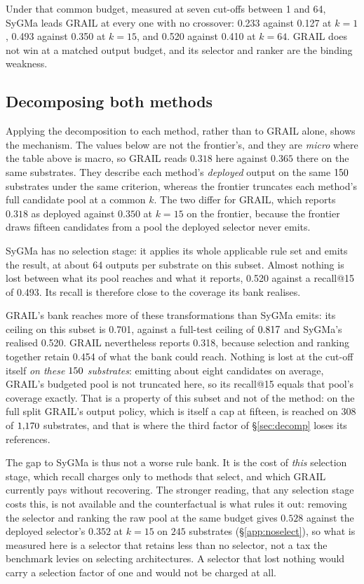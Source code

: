 Under that common budget, measured at seven cut-offs between 1 and 64, SyGMa leads GRAIL at every
one with no crossover: 0.233 against 0.127 at $k=1$, 0.493 against 0.350 at $k=15$, and 0.520
against 0.410 at $k=64$. GRAIL does not win at a matched output budget, and its selector and ranker
are the binding weakness.

\subsection{Decomposing both methods}

Applying the decomposition to each method, rather than to GRAIL alone, shows the mechanism. The
values below are not the frontier's, and they are \emph{micro} where the table above is macro, so
GRAIL reads $0.318$ here against $0.365$ there on the same substrates. They describe each method's
\emph{deployed} output on the same
$150$ substrates under the same criterion, whereas the frontier truncates each method's full
candidate pool at a common $k$. The two differ for GRAIL, which reports $0.318$ as deployed against
$0.350$ at $k=15$ on the frontier, because the frontier draws fifteen candidates from a pool the
deployed selector never emits.

SyGMa has no selection stage: it applies its whole applicable rule set and emits the result, at
about 64 outputs per substrate on this subset. Almost nothing is lost between what its pool
reaches and what it reports, 0.520 against a recall@15 of 0.493. Its recall is therefore close to
the coverage its bank realises.

GRAIL's bank reaches more of these transformations than SyGMa emits: its ceiling on this subset is
0.701, against a full-test ceiling of $0.817$ and SyGMa's realised 0.520. GRAIL nevertheless
reports 0.318, because selection and ranking together retain 0.454 of what the bank could reach.
Nothing is lost at the cut-off itself \emph{on these $150$ substrates}: emitting about eight
candidates on average, GRAIL's budgeted pool is not truncated here, so its recall@15 equals that
pool's coverage exactly. That is a property of this subset and not of the method: on the full split
GRAIL's output policy, which is itself a cap at fifteen, is reached on $308$ of $1{,}170$ substrates, and
that is where the third factor of \S\ref{sec:decomp} loses its references.

The gap to SyGMa is thus not a worse rule bank. It is the cost of \emph{this} selection stage,
which recall charges only to methods that select, and which GRAIL currently pays without
recovering. The stronger reading, that any selection stage costs this, is not available and the
counterfactual is what rules it out: removing the selector and ranking the raw pool at the same
budget gives $0.528$ against the deployed selector's $0.352$ at $k=15$ on $245$ substrates
(\S\ref{app:noselect}), so what is measured here is a selector that retains less than no selector,
not a tax the benchmark levies on selecting architectures. A selector that lost nothing would carry
a selection factor of one and would not be charged at all.
